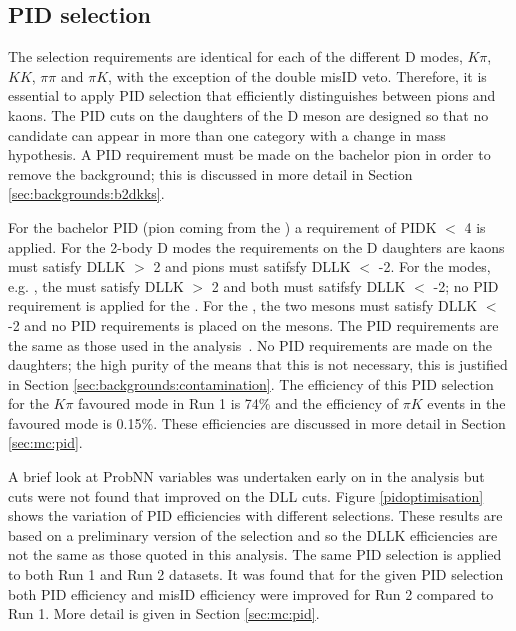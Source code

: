 \subsection{PID selection}
\label{sec:selection:pid}

The selection requirements are identical for each of the different D modes, $K\pi$, $KK$, $\pi\pi$ and $\pi K$, with the exception of the double misID veto. Therefore, it is essential to apply PID selection that efficiently distinguishes between pions and kaons. The PID cuts on the daughters of the D meson are designed so that no  candidate can appear in more than one category with a change in mass hypothesis. A PID requirement must be made on the bachelor pion in order to remove the \decay{\B}{\D\KS\kaon} background; this is discussed in more detail in Section \ref{sec:backgrounds:b2dkks}. 

For the bachelor PID (pion coming from the \Kstarm) a requirement of PIDK $<$ 4 is applied. For the 2-body D modes the requirements on the D daughters are kaons must satisfy DLLK $>$ 2 and pions must satifsfy DLLK $<$ -2. For the  modes, e.g. \decay{\Dz}{\Km\pip\pim\pip}, the \Km must satisfy DLLK $>$ 2 and both \pip must satifsfy DLLK $<$ -2; no PID requirement is applied for the \pip. For the \decay{\Dz}{\pip\pim\pip\pim}, the two \pip mesons must satisfy DLLK $<$ -2 and no PID requirements is placed on the \pim mesons. The PID requirements are the same as those used in the \decay{\Bp}{\D\Kp} analysis~\cite{LHCb-PAPER-2016-003}. No PID requirements are made on the \KS daughters; the high purity of the \KS means that this is not necessary, this is justified in Section \ref{sec:backgrounds:contamination}. The efficiency of this PID selection for the $K\pi$ favoured mode in Run 1 is 74\% and the efficiency of $\pi K$ events in the favoured mode is 0.15\%. These efficiencies are discussed in more detail in Section \ref{sec:mc:pid}. 


A brief look at ProbNN variables was undertaken early on in the analysis but cuts were not found that improved on the DLL cuts. Figure \ref{pidoptimisation} shows the variation of PID efficiencies with different selections. These results are based on a preliminary version of the selection and so the DLLK efficiencies are not the same as those quoted in this analysis.  The same PID selection is applied to both Run 1 and Run 2 datasets. It was found that for the given PID selection both PID efficiency and misID efficiency were improved for Run 2 compared to Run 1. More detail is given in Section \ref{sec:mc:pid}.


